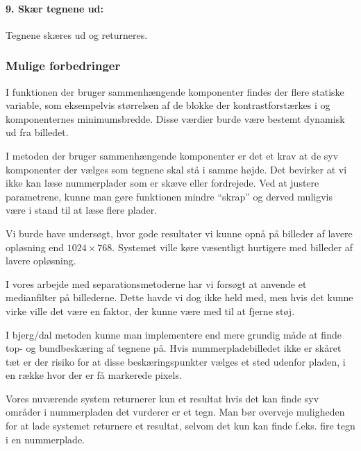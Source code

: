 \paragraph{9. Skær tegnene ud:} Tegnene skæres ud og returneres.


\subsubsection{Mulige forbedringer}
I funktionen der bruger sammenhængende komponenter findes der flere statiske variable, som eksempelvis størrelsen af de blokke der kontrastforstærkes i og komponenternes minimumsbredde. Disse værdier burde være bestemt dynamisk ud fra billedet.

I metoden der bruger sammenhængende komponenter er det et krav at de syv komponenter der vælges som tegnene skal stå i samme højde. Det bevirker at vi ikke kan læse nummerplader som er skæve eller fordrejede. Ved at justere parametrene, kunne man gøre funktionen mindre ``skrap'' og derved muligvis være i stand til at læse flere plader.

Vi burde have undersøgt, hvor gode resultater vi kunne opnå på billeder af lavere opløsning end $1024 \times 768$. Systemet ville køre væsentligt hurtigere med billeder af lavere opløsning.


I vores arbejde med separationsmetoderne har vi forsøgt at anvende et medianfilter på billederne. Dette havde vi dog ikke held med, men hvis det kunne virke ville det være en faktor, der kunne være med til at fjerne støj.

I bjerg/dal metoden kunne man implementere end mere grundig måde at finde top- og bundbeskæring af tegnene på. Hvis nummerpladebilledet ikke er skåret tæt er der risiko for at disse beskæringspunkter vælges et sted udenfor pladen, i en række hvor der er få markerede pixels.

Vores nuværende system returnerer kun et resultat hvis det kan finde syv områder i nummerpladen det vurderer er et tegn. Man bør overveje muligheden for at lade systemet returnere et resultat, selvom det kun kan finde f.eks. fire tegn i en nummerplade.


